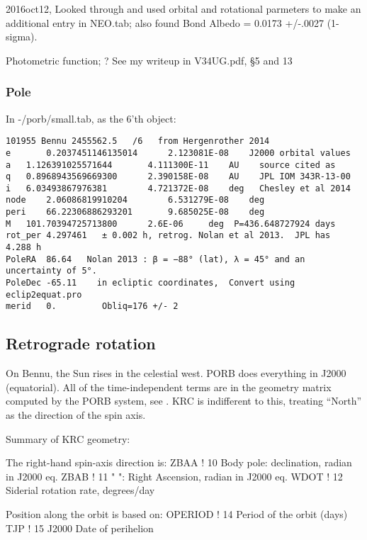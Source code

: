 \documentclass{article}
\begin{document}
2016oct12, Looked through \qcite{} and used orbital and rotational parmeters to
make an additional entry in NEO.tab; also found Bond Albedo = 0.0173 +/-.0027
(1-sigma).

Photometric function; ? See my writeup in V34UG.pdf, \S 5 and 13

\subsubsection{Pole}

In -/porb/small.tab, as the 6'th object: 
\vspace{-3.mm} 
\begin{verbatim}
101955 Bennu 2455562.5   /6   from Hergenrother 2014
e       0.2037451146135014      2.123081E-08    J2000 orbital values 
a 	1.126391025571644       4.111300E-11	AU    source cited as 
q 	0.8968943569669300      2.390158E-08 	AU    JPL IOM 343R-13-00
i 	6.03493867976381        4.721372E-08	deg   Chesley et al 2014
node 	2.06086819910204        6.531279E-08	deg    
peri    66.22306886293201       9.685025E-08	deg
M 	101.70394725713800      2.6E-06 	deg  P=436.648727924 days
rot_per 4.297461   ± 0.002 h, retrog. Nolan et al 2013.  JPL has  4.288 h 
PoleRA  86.64   Nolan 2013 : β = −88° (lat), λ = 45° and an uncertainty of 5°.  
PoleDec -65.11    in ecliptic coordinates,  Convert using eclip2equat.pro 
merid   0.         Obliq=176 +/- 2
\end{verbatim}


\subsection{Retrograde rotation}  %
On Bennu, the Sun rises in the celestial west. PORB does everything in J2000 (equatorial).  All of the time-independent terms are in the geometry matrix computed by the PORB system, see  . 
KRC is indifferent to this, treating ``North'' as the direction of the spin axis.

Summary of KRC geometry:

The right-hand spin-axis direction is: 
\qi ZBAA ! 10 Body pole: declination, radian in J2000 eq.
\qi ZBAB ! 11 " ": Right Ascension, radian in J2000 eq.
\qi WDOT ! 12 Siderial rotation rate, degrees/day

Position along the orbit is based on:
\qi OPERIOD ! 14 Period of the orbit (days)
\qi TJP ! 15 J2000 Date of perihelion
\end{document}
